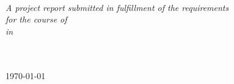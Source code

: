 \documentclass[
11pt, 
oneside,
english,
onehalfspacing,
onehalfspacing,
parskip,
headsepline,
chapterinoneline,
]{MastersDoctoralThesis}
\begin{document}
\begin{titlepage}
\begin{center}
\begin{minipage}[t]{0.4\textwidth}
\begin{flushright}
\end{flushright}
\end{minipage}\\[0.5cm]

\vfill

\large \textit{A project report submitted in fulfillment of the requirements\\ for the course of
\degreename}\\[0.25cm]
\textit{in}\\[0.25cm]
\groupname\\\deptname\\[1cm]
 
\vfill

{\addressname \text{, } \large \today}\\[4cm]
 
\vfill
\end{center}
\end{titlepage}


\tableofcontents %

\listoffigures %

\listoftables %

\end{document}
